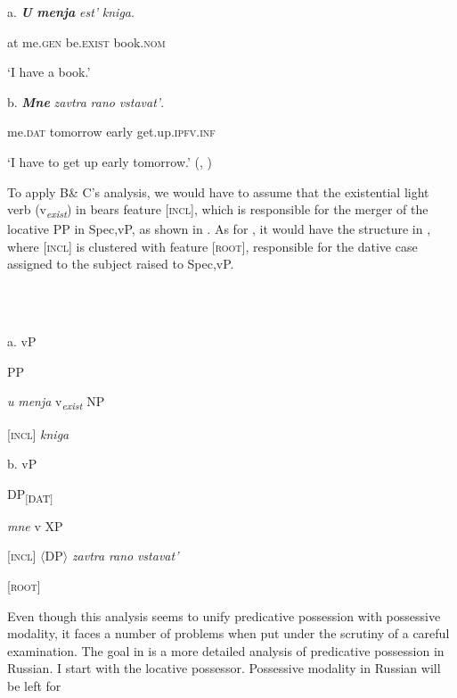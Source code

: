 \documentclass[output=paper,modfonts,nonflat]{langsci/langscibook}
\begin{document}
          a.  \textbf{\textit{U}  \textit{menja}}     \textit{est’}           \textit{kniga}.

    at  me.\textsc{gen}   be.\textsc{exist}    book.\textsc{nom}

    ‘I have a book.’

  b.   \textbf{\textit{Mne} }      \textit{zavtra}       \textit{rano}   \textit{vstavat’}.

    me.\textsc{dat}  tomorrow  early  get.up.\textsc{ipfv.inf}

  ‘I have to get up early tomorrow.’ (\citealt{Tsedryk2018}, )  

To apply B\& C’s analysis, we would have to assume that the existential light verb (v\textit{\textsubscript{exist}}) in  bears feature [\textsc{incl}], which is responsible for the merger of the locative PP in Spec,vP, as shown in . As for , it would have the structure in , where [\textsc{incl}] is clustered with feature [\textsc{root}], responsible for the dative case assigned to the subject raised to Spec,vP.

\ea%
    \label{ex:key:7}
    \gll\\
        \\
    \glt
    \z

          a.  vP    


  

    PP  

    \textit{u} \textit{menja}  v\textit{\textsubscript{exist}}   NP 

      [\textsc{incl}]  \textit{kniga}

  b.  vP    


  

    DP\textsubscript{[DAT]}  

    \textit{mne}  v    XP

      [\textsc{incl}]  ${\langle}$DP${\rangle}$ \textit{zavtra} \textit{rano} \textit{vstavat’}

      [\textsc{root}]  

Even though this analysis seems to unify predicative possession with possessive modality, it faces a number of problems when put under the scrutiny of a careful examination. The goal in  is a more detailed analysis of predicative possession in Russian. I start with the locative possessor. Possessive modality in Russian will be left for 
\end{document}
